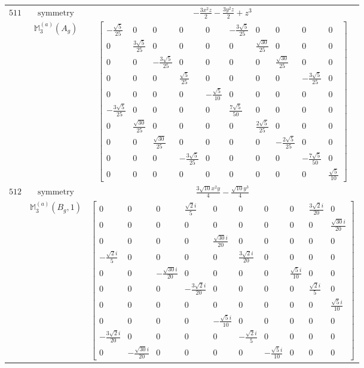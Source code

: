 \documentclass[fleqn,8pt,landscape]{jsarticle}
\begin{document}
\begin{longtable}{ccc}
$ 511 $ & $ \text{symmetry} $ & $ - \frac{3 x^{2} z}{2} - \frac{3 y^{2} z}{2} + z^{3} $ \\
$  $ & $ \mathbb{M}_{3}^{(a)}(A_{g}) $ & $ \begin{bmatrix} - \frac{\sqrt{5}}{25} & 0 & 0 & 0 & 0 & - \frac{3 \sqrt{5}}{25} & 0 & 0 & 0 & 0 \\ 0 & \frac{3 \sqrt{5}}{25} & 0 & 0 & 0 & 0 & \frac{\sqrt{30}}{25} & 0 & 0 & 0 \\ 0 & 0 & - \frac{3 \sqrt{5}}{25} & 0 & 0 & 0 & 0 & \frac{\sqrt{30}}{25} & 0 & 0 \\ 0 & 0 & 0 & \frac{\sqrt{5}}{25} & 0 & 0 & 0 & 0 & - \frac{3 \sqrt{5}}{25} & 0 \\ 0 & 0 & 0 & 0 & - \frac{\sqrt{5}}{10} & 0 & 0 & 0 & 0 & 0 \\ - \frac{3 \sqrt{5}}{25} & 0 & 0 & 0 & 0 & \frac{7 \sqrt{5}}{50} & 0 & 0 & 0 & 0 \\ 0 & \frac{\sqrt{30}}{25} & 0 & 0 & 0 & 0 & \frac{2 \sqrt{5}}{25} & 0 & 0 & 0 \\ 0 & 0 & \frac{\sqrt{30}}{25} & 0 & 0 & 0 & 0 & - \frac{2 \sqrt{5}}{25} & 0 & 0 \\ 0 & 0 & 0 & - \frac{3 \sqrt{5}}{25} & 0 & 0 & 0 & 0 & - \frac{7 \sqrt{5}}{50} & 0 \\ 0 & 0 & 0 & 0 & 0 & 0 & 0 & 0 & 0 & \frac{\sqrt{5}}{10} \end{bmatrix} $ \\ \hline
$ 512 $ & $ \text{symmetry} $ & $ \frac{3 \sqrt{10} x^{2} y}{4} - \frac{\sqrt{10} y^{3}}{4} $ \\
$  $ & $ \mathbb{M}_{3}^{(a)}(B_{g},1) $ & $ \begin{bmatrix} 0 & 0 & 0 & \frac{\sqrt{2} i}{5} & 0 & 0 & 0 & 0 & \frac{3 \sqrt{2} i}{20} & 0 \\ 0 & 0 & 0 & 0 & 0 & 0 & 0 & 0 & 0 & \frac{\sqrt{30} i}{20} \\ 0 & 0 & 0 & 0 & \frac{\sqrt{30} i}{20} & 0 & 0 & 0 & 0 & 0 \\ - \frac{\sqrt{2} i}{5} & 0 & 0 & 0 & 0 & \frac{3 \sqrt{2} i}{20} & 0 & 0 & 0 & 0 \\ 0 & 0 & - \frac{\sqrt{30} i}{20} & 0 & 0 & 0 & 0 & \frac{\sqrt{5} i}{10} & 0 & 0 \\ 0 & 0 & 0 & - \frac{3 \sqrt{2} i}{20} & 0 & 0 & 0 & 0 & \frac{\sqrt{2} i}{5} & 0 \\ 0 & 0 & 0 & 0 & 0 & 0 & 0 & 0 & 0 & \frac{\sqrt{5} i}{10} \\ 0 & 0 & 0 & 0 & - \frac{\sqrt{5} i}{10} & 0 & 0 & 0 & 0 & 0 \\ - \frac{3 \sqrt{2} i}{20} & 0 & 0 & 0 & 0 & - \frac{\sqrt{2} i}{5} & 0 & 0 & 0 & 0 \\ 0 & - \frac{\sqrt{30} i}{20} & 0 & 0 & 0 & 0 & - \frac{\sqrt{5} i}{10} & 0 & 0 & 0 \end{bmatrix} $ \\ \hline

\end{longtable}
\end{document}
